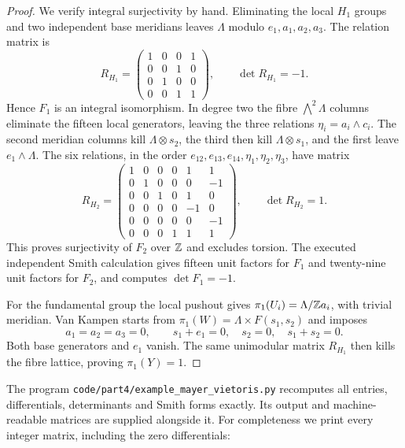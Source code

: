 \begin{proof}
We verify integral surjectivity by hand. Eliminating the local $H_1$
groups and two independent base meridians leaves $\Lambda$ modulo
$e_1,a_1,a_2,a_3$. The relation matrix is
\[
 R_{H_1}=\begin{pmatrix}1&0&0&1\\0&0&1&0\\0&1&0&0\\0&0&1&1\end{pmatrix},
 \qquad\det R_{H_1}=-1.
\]
Hence $F_1$ is an integral isomorphism. In degree two the fibre
$\bigwedge^2\Lambda$ columns eliminate the fifteen local generators,
leaving the three relations $\eta_i=a_i\wedge c_i$. The second meridian
columns kill $\Lambda\otimes s_2$, the third then kill
$\Lambda\otimes s_1$, and the first leave $e_1\wedge\Lambda$. The six
relations, in the order $e_{12},e_{13},e_{14},\eta_1,\eta_2,\eta_3$, have
matrix
\[
R_{H_2}=\begin{pmatrix}
1&0&0&0&1&1\\0&1&0&0&0&-1\\0&0&1&0&1&0\\
0&0&0&0&-1&0\\0&0&0&0&0&-1\\0&0&0&1&1&1
\end{pmatrix},\qquad \det R_{H_2}=1.
\]
This proves surjectivity of $F_2$ over $\mathbb Z$ and excludes torsion. The
executed independent Smith calculation gives fifteen unit factors for
$F_1$ and twenty-nine unit factors for $F_2$, and computes $\det F_1=-1$.

For the fundamental group the local pushout gives
$\pi_1(U_i)=\Lambda/\mathbb Z a_i$, with trivial meridian. Van Kampen starts
from $\pi_1(W)=\Lambda\times F(s_1,s_2)$ and imposes
\[
 a_1=a_2=a_3=0,\qquad s_1+e_1=0,\quad s_2=0,\quad s_1+s_2=0.
\]
Both base generators and $e_1$ vanish. The same unimodular matrix
$R_{H_1}$ then kills the fibre lattice, proving $\pi_1(Y)=1$.
\end{proof}

The program \texttt{code/part4/example\_mayer\_vietoris.py} recomputes all
entries, differentials, determinants and Smith forms exactly. Its output
and machine-readable matrices are supplied alongside it. For completeness
we print every integer matrix, including the zero differentials:


